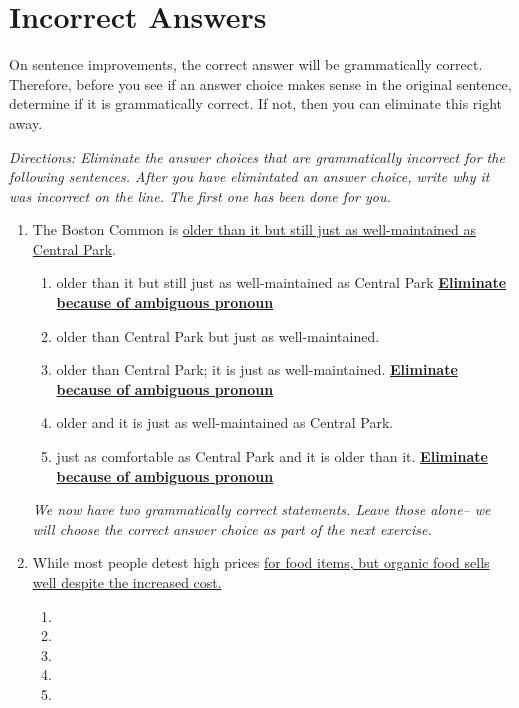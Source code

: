 \section{Incorrect Answers}

On sentence improvements, the correct answer will be grammatically correct. Therefore, before
you see if an answer choice makes sense in the original sentence, determine if it is grammatically
correct. If not, then you can eliminate this right away.

\bigskip
\textit{Directions: Eliminate the answer choices that are grammatically incorrect for the following sentences. After you have elimintated an answer choice, write why it was incorrect on the line. The first one has been done for you.}

\begin{enumerate}
\item The Boston Common is \ul{ older than it but still just as well-maintained as Central Park}.
\begin{enumerate}[label=(\Alph*)]

\item older than it but still just as well-maintained as Central Park \textbf{ \ul{Eliminate because of ambiguous pronoun}}
\item older than Central Park but just as well-maintained. \longline
\item  older than Central Park; it is just as well-maintained. \textbf{ \ul{Eliminate because of ambiguous pronoun}}
\item older and it is just as well-maintained as Central Park. \longline
\item just as comfortable as Central Park and it is older than it. \textbf{ \ul{Eliminate because of ambiguous pronoun}}
\end{enumerate}

\bigskip
\textit{We now have two grammatically correct statements. Leave those alone-- we will choose the correct answer choice as part of the next exercise.}


\bigskip
\item While most people detest high prices \ul{for food items, but organic food sells well despite the increased cost.}

\bigskip
\begin{enumerate}[label=(\Alph*)]
\item\hrulefill
\item\hrulefill
\item\hrulefill
\item\hrulefill
\item\hrulefill
\end{enumerate}


\end{enumerate}
